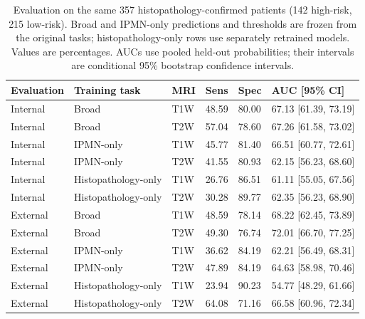\documentclass{article}
\newcommand{\zwrev}[1]{{\color{ZhixiangPink}#1}}
\begin{document}
\clearpage
\begin{table}[ht]
\centering
\caption{\zwrev{Evaluation on the same 357 histopathology-confirmed patients (142 high-risk, 215 low-risk). Broad and IPMN-only predictions and thresholds are frozen from the original tasks; histopathology-only rows use separately retrained models. Values are percentages. AUCs use pooled held-out probabilities; their intervals are conditional 95\% bootstrap confidence intervals.}}
\label{tab:zw-frozen-pathology}
{\color{ZhixiangPink}\small
\begin{tabular}{llllll}
\toprule
Evaluation & Training task & MRI & Sens & Spec & AUC [95\% CI]\\
\midrule
Internal & Broad & T1W & 48.59 & 80.00 & 67.13 [61.39, 73.19]\\
Internal & Broad & T2W & 57.04 & 78.60 & 67.26 [61.58, 73.02]\\
Internal & IPMN-only & T1W & 45.77 & 81.40 & 66.51 [60.77, 72.61]\\
Internal & IPMN-only & T2W & 41.55 & 80.93 & 62.15 [56.23, 68.60]\\
Internal & Histopathology-only & T1W & 26.76 & 86.51 & 61.11 [55.05, 67.56]\\
Internal & Histopathology-only & T2W & 30.28 & 89.77 & 62.35 [56.23, 68.90]\\
External & Broad & T1W & 48.59 & 78.14 & 68.22 [62.45, 73.89]\\
External & Broad & T2W & 49.30 & 76.74 & 72.01 [66.70, 77.25]\\
External & IPMN-only & T1W & 36.62 & 84.19 & 62.21 [56.49, 68.31]\\
External & IPMN-only & T2W & 47.89 & 84.19 & 64.63 [58.98, 70.46]\\
External & Histopathology-only & T1W & 23.94 & 90.23 & 54.77 [48.29, 61.66]\\
External & Histopathology-only & T2W & 64.08 & 71.16 & 66.58 [60.96, 72.34]\\
\bottomrule
\end{tabular}}
\end{table}
\end{document}
